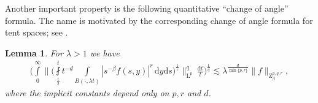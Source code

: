 \documentclass[11pt, leqno,parskip=half]{amsart}
\newtheorem{lemma}[theorem]{Lemma}
\theoremstyle{definition}
\renewcommand{\L}{\mathrm{L}}
\newcommand{\Z}{\mathrm{Z}}
\renewcommand{\d}{\mathrm{d}}
\numberwithin{equation}{section}
\begin{document}
Another important property is the following quantitative \enquote{change of angle} formula. The name is motivated by the corresponding change of angle formula for tent spaces; see \cite{Auscher}.

\begin{lemma}
\label{lem: change of angle}
    For $\lambda >1$ we have
    \begin{align*}
         \bigg(\int\limits_{0}^\infty \bigg\|\bigg(\fint\limits_{\frac{t}{2}}^t t^{-d}\int\limits_{B(\cdot,\lambda t)} |s^{-\beta}f(s,y)|^r \, \d y \d s\bigg)^\frac{1}{r} \bigg\|_{\L^p}^q\,\frac{\d t}{t}\bigg)^\frac{1}{q} \lesssim \lambda^\frac{d}{\min\{p,r\}} \|f\|_{\Z^{p,q,r}_\beta},
    \end{align*}
    where the implicit constants depend only on $p,r$ and $d$.
\end{lemma}
\end{document}

